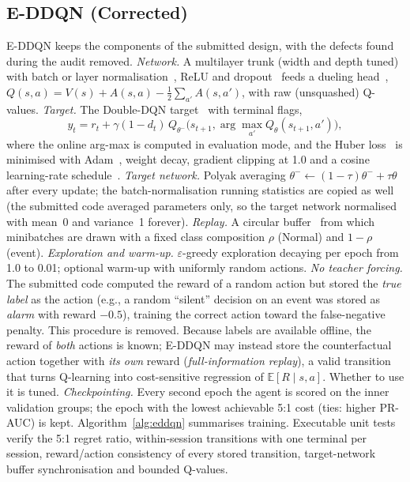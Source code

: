 \subsection{E-DDQN (Corrected)}
\label{sec:eddqn}
E-DDQN keeps the components of the submitted design, with the defects found during the audit removed.
\emph{Network.} A multilayer trunk (width and depth tuned) with batch or layer normalisation~\cite{ioffe2015bn}, ReLU and dropout~\cite{srivastava2014dropout} feeds a dueling head~\cite{wang2016dueling}, $Q(s,a)=V(s)+A(s,a)-\frac{1}{2}\sum_{a'}A(s,a')$, with raw (unsquashed) Q-values.
\emph{Target.} The Double-DQN target~\cite{vanhasselt2016double} with terminal flags,
\begin{equation}
y_t=r_t+\gamma(1-d_t)\,Q_{\theta^-}\big(s_{t+1},\arg\max_{a'}Q_\theta(s_{t+1},a')\big),
\end{equation}
where the online arg-max is computed in evaluation mode, and the Huber loss~\cite{girshick2015fast} is minimised with Adam~\cite{kingma2015adam}, weight decay, gradient clipping at 1.0 and a cosine learning-rate schedule~\cite{loshchilov2017sgdr}.
\emph{Target network.} Polyak averaging $\theta^-\leftarrow(1-\tau)\theta^-+\tau\theta$~\cite{lillicrap2016continuous} after every update; the batch-normalisation running statistics are copied as well (the submitted code averaged parameters only, so the target network normalised with mean~0 and variance~1 forever).
\emph{Replay.} A circular buffer~\cite{lin1992selfimproving} from which minibatches are drawn with a fixed class composition $\rho$ (Normal) and $1-\rho$ (event).
\emph{Exploration and warm-up.} $\varepsilon$-greedy exploration decaying per epoch from 1.0 to 0.01; optional warm-up with uniformly random actions.
\emph{No teacher forcing.} The submitted code computed the reward of a random action but stored the \emph{true label} as the action (e.g., a random ``silent'' decision on an event was stored as \emph{alarm} with reward $-0.5$), training the correct action toward the false-negative penalty. This procedure is removed. Because labels are available offline, the reward of \emph{both} actions is known; E-DDQN may instead store the counterfactual action together with \emph{its own} reward (\emph{full-information replay}), a valid transition that turns Q-learning into cost-sensitive regression of $\mathbb{E}[R\mid s,a]$. Whether to use it is tuned.
\emph{Checkpointing.} Every second epoch the agent is scored on the inner validation groups; the epoch with the lowest achievable 5:1 cost (ties: higher PR-AUC) is kept.
Algorithm~\ref{alg:eddqn} summarises training. Executable unit tests verify the 5:1 regret ratio, within-session transitions with one terminal per session, reward/action consistency of every stored transition, target-network buffer synchronisation and bounded Q-values.

